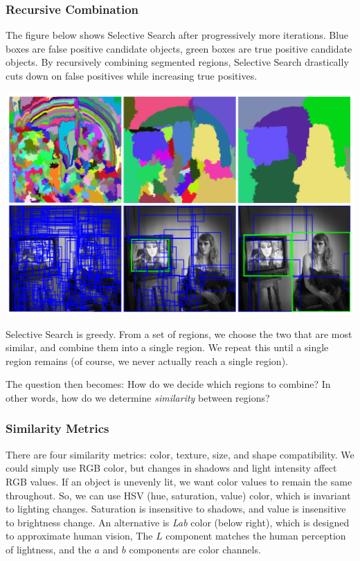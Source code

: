 \documentclass{article}
\begin{document}
\subsubsection{Recursive Combination}
The figure below shows Selective Search after progressively more iterations. Blue boxes are false positive candidate objects, green boxes are true positive candidate objects. By recursively combining segmented regions, Selective Search drastically cuts down on false positives while increasing true positives.
\begin{center}
\includegraphics[scale=0.5]{selective2.PNG}
\end{center}

Selective Search is greedy. From a set of regions, we choose the two that are most similar, and combine them into a single region. We repeat this until a single region remains (of course, we never actually reach a single region).

The question then becomes: How do we decide which regions to combine? In other words, how do we determine \textit{similarity} between regions?

\subsubsection{Similarity Metrics}
There are four similarity metrics: color, texture, size, and shape compatibility. We could simply use RGB color, but changes in shadows and light intensity affect RGB values. If an object is unevenly lit, we want color values to remain the same throughout. So, we can use HSV (hue, saturation, value) color, which is invariant to lighting changes. Saturation is insensitive to shadows, and value is insensitive to brightness change. An alternative is \textit{Lab} color (below right), which is designed to approximate human vision, The $L$ component matches the human perception of lightness, and the $a$ and $b$ components are color channels.
\end{document}

